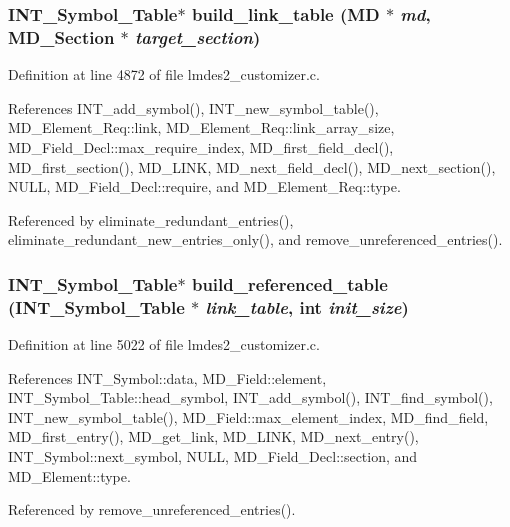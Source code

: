 \subsubsection{\setlength{\rightskip}{0pt plus 5cm}\bf{INT\_\-Symbol\_\-Table}$\ast$ build\_\-link\_\-table (\bf{MD} $\ast$ {\em md}, \bf{MD\_\-Section} $\ast$ {\em target\_\-section})}\label{lmdes2__customizer_8c_5c514dd5e4fda6d0660bfaf6ea103344}




Definition at line 4872 of file lmdes2\_\-customizer.c.

References INT\_\-add\_\-symbol(), INT\_\-new\_\-symbol\_\-table(), MD\_\-Element\_\-Req::link, MD\_\-Element\_\-Req::link\_\-array\_\-size, MD\_\-Field\_\-Decl::max\_\-require\_\-index, MD\_\-first\_\-field\_\-decl(), MD\_\-first\_\-section(), MD\_\-LINK, MD\_\-next\_\-field\_\-decl(), MD\_\-next\_\-section(), NULL, MD\_\-Field\_\-Decl::require, and MD\_\-Element\_\-Req::type.

Referenced by eliminate\_\-redundant\_\-entries(), eliminate\_\-redundant\_\-new\_\-entries\_\-only(), and remove\_\-unreferenced\_\-entries().
\subsubsection{\setlength{\rightskip}{0pt plus 5cm}\bf{INT\_\-Symbol\_\-Table}$\ast$ build\_\-referenced\_\-table (\bf{INT\_\-Symbol\_\-Table} $\ast$ {\em link\_\-table}, int {\em init\_\-size})}\label{lmdes2__customizer_8c_a6b6366bf2fed45e215362f0acf2c5ba}




Definition at line 5022 of file lmdes2\_\-customizer.c.

References INT\_\-Symbol::data, MD\_\-Field::element, INT\_\-Symbol\_\-Table::head\_\-symbol, INT\_\-add\_\-symbol(), INT\_\-find\_\-symbol(), INT\_\-new\_\-symbol\_\-table(), MD\_\-Field::max\_\-element\_\-index, MD\_\-find\_\-field, MD\_\-first\_\-entry(), MD\_\-get\_\-link, MD\_\-LINK, MD\_\-next\_\-entry(), INT\_\-Symbol::next\_\-symbol, NULL, MD\_\-Field\_\-Decl::section, and MD\_\-Element::type.

Referenced by remove\_\-unreferenced\_\-entries().
